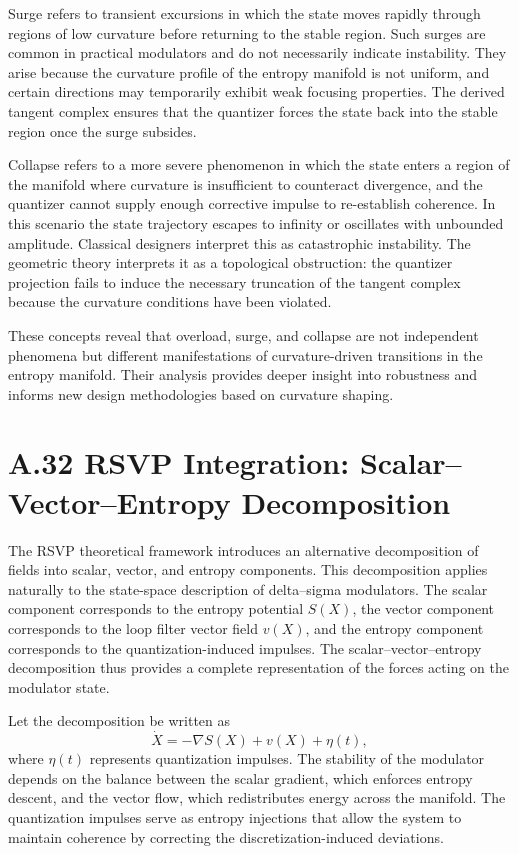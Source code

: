 Surge refers to transient excursions in which the state moves rapidly through regions of low curvature before returning to the stable region. Such surges are common in practical modulators and do not necessarily indicate instability. They arise because the curvature profile of the entropy manifold is not uniform, and certain directions may temporarily exhibit weak focusing properties. The derived tangent complex ensures that the quantizer forces the state back into the stable region once the surge subsides.

Collapse refers to a more severe phenomenon in which the state enters a region of the manifold where curvature is insufficient to counteract divergence, and the quantizer cannot supply enough corrective impulse to re-establish coherence. In this scenario the state trajectory escapes to infinity or oscillates with unbounded amplitude. Classical designers interpret this as catastrophic instability. The geometric theory interprets it as a topological obstruction: the quantizer projection fails to induce the necessary truncation of the tangent complex because the curvature conditions have been violated.

These concepts reveal that overload, surge, and collapse are not independent phenomena but different manifestations of curvature-driven transitions in the entropy manifold. Their analysis provides deeper insight into robustness and informs new design methodologies based on curvature shaping.

\section{A.32 RSVP Integration: Scalar–Vector–Entropy Decomposition}

The RSVP theoretical framework introduces an alternative decomposition of fields into scalar, vector, and entropy components. This decomposition applies naturally to the state-space description of delta–sigma modulators. The scalar component corresponds to the entropy potential \(S(X)\), the vector component corresponds to the loop filter vector field \(v(X)\), and the entropy component corresponds to the quantization-induced impulses. The scalar–vector–entropy decomposition thus provides a complete representation of the forces acting on the modulator state.

Let the decomposition be written as
\[
\dot{X} = -\nabla S(X) + v(X) + \eta(t),
\]
where \(\eta(t)\) represents quantization impulses. The stability of the modulator depends on the balance between the scalar gradient, which enforces entropy descent, and the vector flow, which redistributes energy across the manifold. The quantization impulses serve as entropy injections that allow the system to maintain coherence by correcting the discretization-induced deviations.


